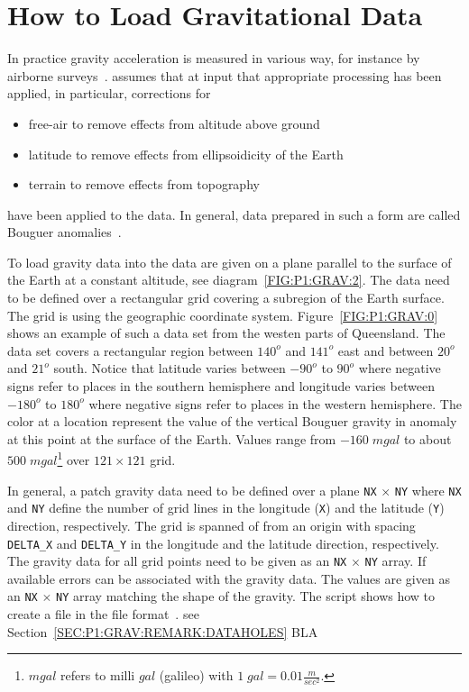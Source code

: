 \section{How to Load Gravitational Data}\label{SEC:P1:GRAV:DATA}
In practice gravity acceleration is measured in various way, for instance by airborne surveys~\cite{Telford1990a}. \downunder
assumes that at input that appropriate processing has been applied,  
in particular, corrections for  
\begin{itemize}
 \item free-air to remove effects from altitude above ground 
 \item latitude to remove effects from ellipsoidicity of the Earth  
 \item terrain to remove effects from topography  
\end{itemize}
have been applied to the data. In general, data prepared in such a form are called Bouguer anomalies~\cite{Telford1990a}. 

To load gravity data into  \downunder the data are given on a plane parallel to the surface of the Earth at a constant
altitude, see diagram~\ref{FIG:P1:GRAV:2}. The data need to be defined over a rectangular grid covering a subregion of 
the Earth surface. 
The grid is using the geographic coordinate system. Figure~\ref{FIG:P1:GRAV:0} shows an example of such a data set
from the westen parts of Queensland. The data set covers a rectangular region between $140^o$ and $141^o$ east 
and between $20^o$ and $21^o$ south. Notice that latitude varies between $-90^o$ to $90^o$ where
negative signs refer to places in the southern hemisphere and
longitude varies between $-180^o$ to $180^o$ where
negative signs refer to places in the western hemisphere.
The color at a location represent the value of the vertical Bouguer gravity in  anomaly at this point at the surface of the Earth.
Values range from $-160  \;  mgal$ to about $500 \; mgal$\footnote{$mgal$ refers to milli $gal$ (galileo) with 
$1 \;  gal = 0.01 \frac{m}{sec^2}$.} over $121 \times 121$ grid.

In general, a patch gravity data need to be defined over a plane \verb|NX| $\times$ \verb|NY| where 
\verb|NX|  and \verb|NY|  define the number of grid lines in the longitude (\verb|X|) and the latitude (\verb|Y|) 
direction, respectively. The grid is spanned of from an origin with spacing
\verb|DELTA_X| and \verb|DELTA_Y| in the longitude and the latitude direction, respectively. 
The gravity data for all grid points need to be given as an \verb|NX| $\times$ \verb|NY| array.  
If available errors can be associated with the gravity data. The values are given as an \verb|NX| $\times$ \verb|NY| array
matching the shape of the gravity. 
The \python script  shows how to create a file in the \netcdf file format~\cite{NETCDF}.
see Section~\ref{SEC:P1:GRAV:REMARK:DATAHOLES}
BLA 

